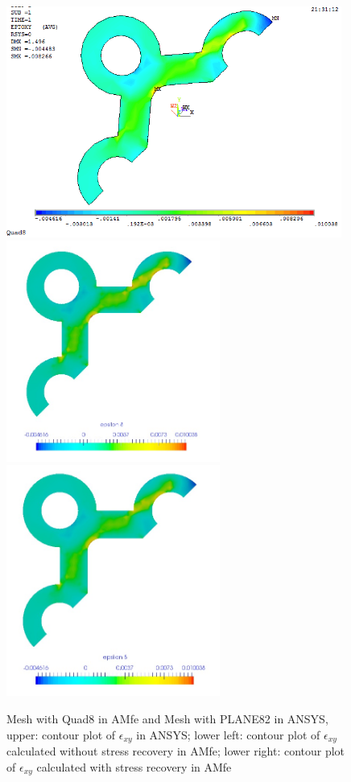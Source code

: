 \begin{figure}[htbp]
	\begin{center}
		\includegraphics[width=11cm,clip]{Quad8_Exy.png} 
		\includegraphics[width=7cm,clip]{Quad8_Exy_PD.png} 			
		\includegraphics[width=7cm,clip]{Quad8_Exy_P.png} 		
		\caption{Mesh with Quad8 in AMfe and Mesh with PLANE82 in ANSYS, upper: contour plot of $\epsilon_{xy}$ in ANSYS; lower left: contour plot of $\epsilon_{xy}$ calculated without stress recovery in AMfe; lower right: contour plot of $\epsilon_{xy}$ calculated with stress recovery in AMfe} \label{fig: Quad8_Exy}
	\end{center}
\end{figure}
\clearpage 

